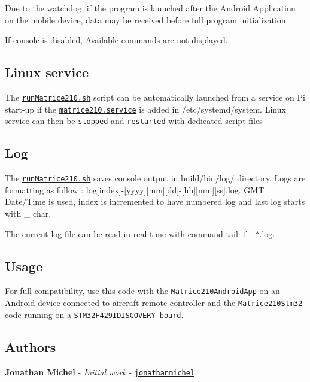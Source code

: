Due to the watchdog, if the program is launched after the Android Application on the mobile device, data may be received before full program initialization.



If console is disabled, {\ttfamily Available commands} are not displayed.

\subsection*{Linux service}

The \href{Linux/runMatrice210.sh}{\tt run\+Matrice210.\+sh} script can be automatically launched from a service on Pi start-\/up if the \href{Linux/matrice210.service}{\tt matrice210.\+service} is added in {\ttfamily /etc/systemd/system}. Linux service can then be \href{Linux/stopMatrice210.sh}{\tt stopped} and \href{Linux/startMatrice210.sh}{\tt restarted} with dedicated script files

\subsection*{Log}

The \href{Linux/runMatrice210.sh}{\tt run\+Matrice210.\+sh} saves console output in {\ttfamily build/bin/log/} directory. Logs are formatting as follow \+: {\ttfamily log\mbox{[}index\mbox{]}-\/\mbox{[}yyyy\mbox{]}\mbox{[}mm\mbox{]}\mbox{[}dd\mbox{]}-\/\mbox{[}hh\mbox{]}\mbox{[}mm\mbox{]}\mbox{[}ss\mbox{]}.log}. G\+MT Date/\+Time is used, {\ttfamily index} is incremented to have numbered log and last log starts with \+\_\+ char.

The current log file can be read in real time with command {\ttfamily tail -\/f \+\_\+$\ast$.log}.

\subsection*{Usage}

For full compatibility, use this code with the \href{https://github.com/jonathanmichel/Matrice210Android}{\tt Matrice210\+Android\+App} on an Android device connected to aircraft remote controller and the \href{https://github.com/jonathanmichel/Matrice210Stm32}{\tt Matrice210\+Stm32} code running on a \href{https://www.st.com/en/evaluation-tools/32f429idiscovery.html}{\tt S\+T\+M32\+F429\+I\+D\+I\+S\+C\+O\+V\+E\+RY board}.

\subsection*{Authors}


\begin{DoxyItemize}
\item {\bfseries Jonathan Michel} -\/ {\itshape Initial work} -\/ \href{https://github.com/jonathanmichel}{\tt jonathanmichel} 
\end{DoxyItemize}